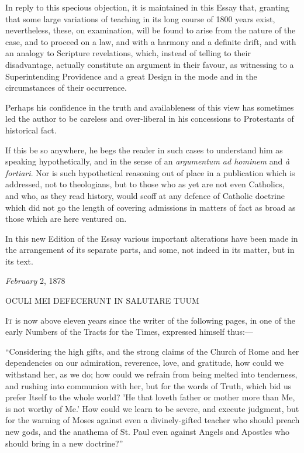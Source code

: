 In reply to this specious objection, it is maintained
in this Essay that, granting that some large variations
of teaching in its long course of 1800 years exist,
nevertheless, these, on examination, will be found to
arise from the nature of the case, and to proceed on a
law, and with a harmony and a definite drift, and with an
analogy to Scripture revelations, which, instead of
telling to their disadvantage, actually constitute an
argument in their favour, as witnessing to a
Superintending Providence and a great Design in the mode
and in the circumstances of their occurrence.


Perhaps his confidence in the truth and availableness
of this view has sometimes led the author to be careless
and over-liberal in his concessions to Protestants of
historical fact.


If this be so anywhere, he begs the reader in such
cases to understand him as speaking hypothetically, and
in the sense of an \emph{argumentum ad hominem} and \emph{à
fortiari}. Nor is such hypothetical reasoning out of
place in a publication which is addressed, not to
theologians, but to those who as yet are not even
Catholics, and who, as they read history, would scoff at
any defence of Catholic doctrine which did not go the
length of covering admissions in matters of fact as broad
as those which are here ventured on.


In this new Edition of the Essay various important
alterations have been made in the arrangement of its
separate parts, and some, not indeed in its matter, but
in its text.


\emph{February} 2, 1878








OCULI MEI DEFECERUNT IN SALUTARE TUUM


I\textsc{t} is now above eleven years since the writer of the
following pages, in one of the early Numbers of the
Tracts for the Times, expressed himself thus:—


``Considering the high gifts, and the strong
claims of the Church of Rome and her dependencies on our
admiration, reverence, love, and gratitude, how could we
withstand her, as we do; how could we refrain from being
melted into tenderness, and rushing into communion with
her, but for the words of Truth, which bid us prefer
Itself to the whole world? 'He that loveth father or
mother more than Me, is not worthy of Me.' How could we
learn to be severe, and execute judgment, but for the
warning of Moses against even a divinely-gifted teacher
who should preach new gods, and the anathema of St. Paul
even against Angels and Apostles who should bring in a
new doctrine?''

